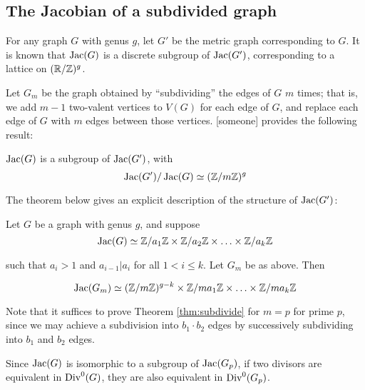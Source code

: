\documentclass{amsart}
\begin{document}
\subsection{The Jacobian of a subdivided graph}

For any graph $G$ with genus $g$, let $G'$ be the metric graph
corresponding to $G$. It is known that $\operatorname{Jac}(G)$ is a discrete
subgroup of $\operatorname{Jac}(G')$, corresponding to a lattice on $(\mathbb{R}/\mathbb{Z})^g$.

Let $G_m$ be the graph obtained by ``subdividing'' the edges of $G$
$m$ times; that is, we add $m-1$ two-valent vertices to $V(G)$ for
each edge of $G$, and replace each edge of $G$ with $m$ edges between
those vertices. [someone] provides the following result:

\begin{prop}
  \label{prop:quotient_subdivide}
  $\operatorname{Jac}(G)$ is a subgroup of $\operatorname{Jac}(G')$, with 
\begin{equation*}
  \operatorname{Jac}(G')/\operatorname{Jac}(G) \simeq (\mathbb{Z}/m\mathbb{Z})^g
\end{equation*}
\end{prop}

The theorem below gives an explicit description of the structure of
$\operatorname{Jac}(G')$:

\begin{thm}
  \label{thm:subdivide}
  Let $G$ be a graph with genus $g$, and suppose
  \begin{equation*}
    \operatorname{Jac}(G) \simeq \mathbb{Z}/a_1\mathbb{Z} \times \mathbb{Z}/a_2\mathbb{Z} \times \ldots \times \mathbb{Z}/a_k\mathbb{Z}
  \end{equation*}

  such that $a_i > 1$ and $a_{i-1} | a_i$ for all $1 < i \le k$. Let
  $G_m$ be as above. Then

  \begin{equation*}
    \operatorname{Jac}(G_m) \simeq (\mathbb{Z}/m\mathbb{Z})^{g-k} 
    \times \mathbb{Z}/ma_1\mathbb{Z} \times \ldots \times \mathbb{Z}/ma_k\mathbb{Z}
  \end{equation*}
\end{thm}

Note that it suffices to prove Theorem \ref{thm:subdivide} for $m=p$
for prime $p$, since we may achieve a subdivision into $b_1 \cdot b_2$
edges by successively subdividing into $b_1$ and $b_2$ edges.

Since $\operatorname{Jac}(G)$ is isomorphic to a subgroup of $\operatorname{Jac}(G_p)$, if two
divisors are equivalent in $\operatorname{Div}^0(G)$, they are also equivalent in
$\operatorname{Div}^0(G_p)$.
\end{document}
